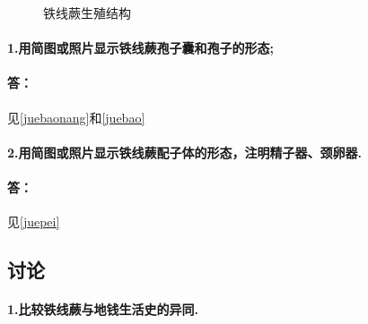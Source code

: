 \documentclass[utf8]{ctexart}
\begin{document}
\begin{figure}[h]
        \caption{铁线蕨生殖结构}
    \end{figure}
        \paragraph*{1.用简图或照片显示铁线蕨孢子囊和孢子的形态;}
        \paragraph*{答：}见\ref{juebaonang}和\ref{juebao}
        \paragraph*{2.用简图或照片显示铁线蕨配子体的形态，注明精子器、颈卵器.}
        \paragraph*{答：}见\ref{juepei}
    \subsection*{讨论}
    \paragraph*{1.比较铁线蕨与地钱生活史的异同.}
\end{document}
